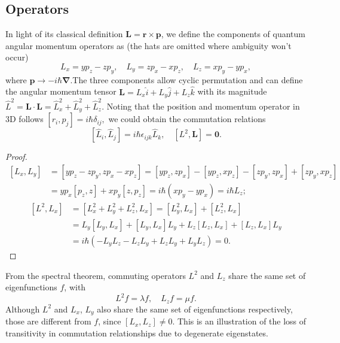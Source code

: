 \documentclass{article}
\theoremstyle{nonumberplain}
\newtheorem{proof}{Proof}
\begin{document}
\subsection{Operators}
In light of its classical definition $\mathbf{L} = \mathbf{r} \times \mathbf{p}$, we define the components of quantum angular momentum operators as (the hats are omitted where ambiguity won't occur)
\[
    L_x = y p_z - z p_y, \quad  L_y = z p_x- x p_z, \quad  L_z = x p_y - y p_x ,
\]
where $\mathbf{p} \to -i \hbar \mathbf{\nabla}. $The three components allow cyclic permutation and can define the angular momentum tensor $\mathbf{L} = L_x \hat{i} + L_y \hat{j} + L_z \hat{k} $ with its magnitude $\hat{L} ^{2} = \mathbf{L} \cdot \mathbf{L} = \hat{L} _x^2 + \hat{L} _y^2 + \hat{L} _z^2. $ Noting that the position and momentum operator in 3D follows $\boxed{[r_i, p_j]= i \hbar \delta _{ij}},$ we could obtain the commutation relations 
\[
    \boxed{
        [\hat{L} _i, \hat{L} _j] = i \hbar \epsilon_{ijk} \hat{L}_k, \quad 
        [L^2, \mathbf{L} ] = \textbf{0}.  
    }
\]
\begin{proof}
\[
        \begin{aligned}
            [L_x, L_y] 
            &= [y p_z - z p_y, z p_x - x p_z]  
            = [y p_z, z p_x] - [y p_z , x p_z] - [z p_y, z p_x] + [z p_y, x p_z] \\ 
            &= y p_x [p_z, z] + x p_y [z, p_z]
            = i \hbar (x p_y - y p_x) = i \hbar L_z; 
        \end{aligned}
\]
\[
        \begin{aligned}
            [L^2, L_x] 
            &= [L_x^2 + L_y^2 + L_z^2 , L_x]
            = [L_y^2, L_x] + [L_z^2, L_x] \\
            &= L_y[L_y, L_x] + [L_y, L_x] L_y + L_z[L_z, L_x] + [L_z, L_x] L_y \\
            &= i \hbar (-L_y L_z - L_z L_y + L_z L_y + L_y L_z ) = 0.
        \end{aligned}  
\]
\end{proof}
From the spectral theorem, commuting operators $L^2$ and $L_z$ share the same set of eigenfunctions $f$, with 
\[
    L^2 f = \lambda f, \quad L_z f = \mu f.
\]
Although $L^2$ and $L_x$, $L_y$ also share the same set of eigenfunctions respectively, those are different from $f$, since $[L_x, L_z] \neq 0$. This is an illustration of the loss of transitivity in commutation relationships due to degenerate eigenstates. 
\end{document}

